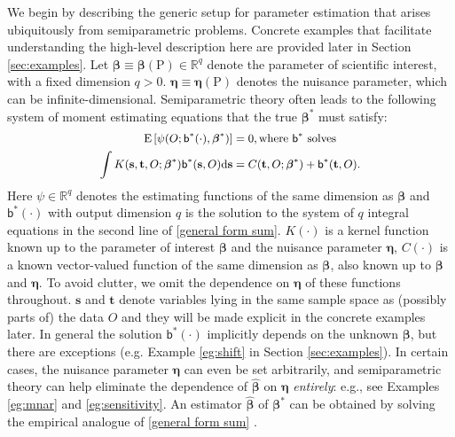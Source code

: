 \documentclass{article}
\def\sfb{\mathsf{b}}
\def\sfb{\mathsf{b}}
\theoremstyle{plain}
\theoremstyle{definition}
\theoremstyle{remark}
\def\diff{\mathrm{d}}
\def\P{\mathrm{P}}
\def\bbeta{\boldsymbol{\beta}}
\def\E{\mathrm{E}}
\def\hat{\widehat}
\begin{document}
We begin by describing the generic setup for parameter estimation that arises ubiquitously from semiparametric problems. Concrete examples that facilitate understanding the high-level description here are provided later in Section \ref{sec:examples}. Let $\bbeta \equiv \bbeta (\P) \in \mathbb{R}^{q}$ denote the parameter of scientific interest, with a fixed dimension $q > 0$. $\bm{\eta} \equiv \bm{\eta} (\P)$ denotes the nuisance parameter, which can be infinite-dimensional. Semiparametric theory \citep{bickel1998efficient, van2002part} often leads to the following system of moment estimating equations that the true $\bbeta^{\ast}$ must satisfy:
\allowdisplaybreaks
\begin{equation}
\small
\begin{split}
\E \left[ \psi (O; \sfb^{\ast} (\cdot), \bbeta^\ast) \right] & = 0, \text{where $\sfb^{\ast}$ solves} \\
\int K(\mathbf{s}, \mathbf{t}, O; \bbeta^\ast) \mathsf{b}^{\ast} (\mathbf{s}, O) \diff \mathbf{s} & = C(\mathbf{t}, O; \bbeta^{\ast})+\sfb^{\ast} (\mathbf{t}, O).
\end{split}
\label{general form sum}
\end{equation}
Here $\psi \in \mathbb{R}^{q}$ denotes the estimating functions of the same dimension as $\bbeta$ and $\sfb^{\ast} (\cdot)$ with output dimension $q$ is the solution to the system of $q$ integral equations in the second line of \eqref{general form sum}. $K(\cdot)$ is a kernel function known up to the parameter of interest $\bbeta$ and the nuisance parameter $\bm{\eta}$, $C (\cdot)$ is a known vector-valued function of the same dimension as $\bbeta$, also known up to $\bbeta$ and $\bm{\eta}$. To avoid clutter, we omit the dependence on $\bm{\eta}$ of these functions throughout. $\mathbf{s}$ and $\mathbf{t}$ denote variables lying in the same sample space as (possibly parts of) the data $O$ and they will be made explicit in the concrete examples later. In general the solution $\sfb^{\ast} (\cdot)$ implicitly depends on the unknown $\bbeta$, but there are exceptions (e.g. Example \ref{eg:shift} in Section \ref{sec:examples}). In certain cases, the nuisance parameter $\bm{\eta}$ can even be set arbitrarily, and semiparametric theory can help eliminate the dependence of $\hat{\bbeta}$ on $\bm{\eta}$ \textit{entirely}: e.g., see Examples \ref{eg:mnar} and \ref{eg:sensitivity}. An estimator $\hat{\bbeta}$ of $\bbeta^\ast$ can be obtained by solving the empirical analogue of \eqref{general form sum} \citep{van2023weak}.
\end{document}
